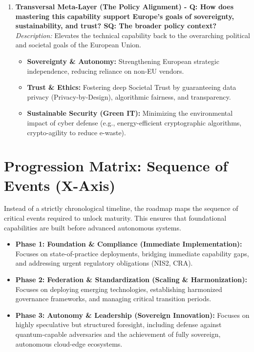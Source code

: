 \documentclass[12pt,a4paper]{article}
\begin{document}
\begin{enumerate}
    \item \textbf{Transversal Meta-Layer (The Policy Alignment) - Q: How does mastering this capability support Europe's goals of sovereignty, sustainability, and trust? SQ: The broader policy context?}\\
    \textit{Description:} Elevates the technical capability back to the overarching political and societal goals of the European Union.
    \begin{itemize}
        \item \textbf{Sovereignty \& Autonomy:} Strengthening European strategic independence, reducing reliance on non-EU vendors.
        \item \textbf{Trust \& Ethics:} Fostering deep Societal Trust by guaranteeing data privacy (Privacy-by-Design), algorithmic fairness, and transparency.
        \item \textbf{Sustainable Security (Green IT):} Minimizing the environmental impact of cyber defense (e.g., energy-efficient cryptographic algorithms, crypto-agility to reduce e-waste).
    \end{itemize}
\end{enumerate}

\section{Progression Matrix: Sequence of Events (X-Axis)}
Instead of a strictly chronological timeline, the roadmap maps the sequence of critical events required to unlock maturity. This ensures that foundational capabilities are built before advanced autonomous systems.

\begin{itemize}
    \item \textbf{Phase 1: Foundation \& Compliance (Immediate Implementation):} Focuses on state-of-practice deployments, bridging immediate capability gaps, and addressing urgent regulatory obligations (NIS2, CRA).
    \item \textbf{Phase 2: Federation \& Standardization (Scaling \& Harmonization):} Focuses on deploying emerging technologies, establishing harmonized governance frameworks, and managing critical transition periods.
    \item \textbf{Phase 3: Autonomy \& Leadership (Sovereign Innovation):} Focuses on highly speculative but structured foresight, including defense against quantum-capable adversaries and the achievement of fully sovereign, autonomous cloud-edge ecosystems.
\end{itemize}
\end{document}
